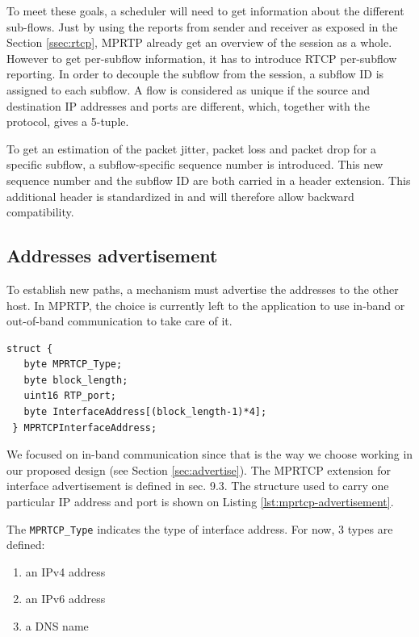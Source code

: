 To meet these goals, a scheduler will need to get information about the different sub-flows. Just by using the reports from sender and receiver as exposed in the Section \ref{ssec:rtcp}, MPRTP already get an overview of the session as a whole. However to get per-subflow information, it has to introduce RTCP per-subflow reporting. In order to decouple the subflow from the session, a subflow ID is assigned to each subflow. A flow is considered as unique if the source and destination IP addresses and ports are different, which, together with the protocol, gives a 5-tuple.

To get an estimation of the packet jitter, packet loss and packet drop for a specific subflow, a subflow-specific sequence number is introduced. This new sequence number and the subflow ID are both carried in a header extension. This additional header is standardized in \cite{RFC3550} and will therefore allow backward compatibility.

\subsection{Addresses advertisement}
\label{sec:mprtp-advertise}

To establish new paths, a mechanism must advertise the addresses to the other host. In MPRTP, the choice is currently \cite{singh-avtcore-mprtp} left to the application to use in-band or out-of-band communication to take care of it.

\begin{lstlisting}[caption=MPRTCP Interface Advertisement, label=lst:mprtcp-advertisement]
struct {
   byte MPRTCP_Type;
   byte block_length;
   uint16 RTP_port;
   byte InterfaceAddress[(block_length-1)*4];
 } MPRTCPInterfaceAddress;
\end{lstlisting}

We focused on in-band communication since that is the way we choose working in our proposed design (see Section \ref{sec:advertise}). The MPRTCP extension for interface advertisement is defined in \cite{singh-avtcore-mprtp} sec. 9.3. The structure used to carry one particular IP address and port is shown on Listing \ref{lst:mprtcp-advertisement}.

The \texttt{MPRTCP\_Type} indicates the type of interface address. For now, 3 types are defined: 
\begin{enumerate}
\item an IPv4 address
\item an IPv6 address
\item a DNS name
\end{enumerate}

